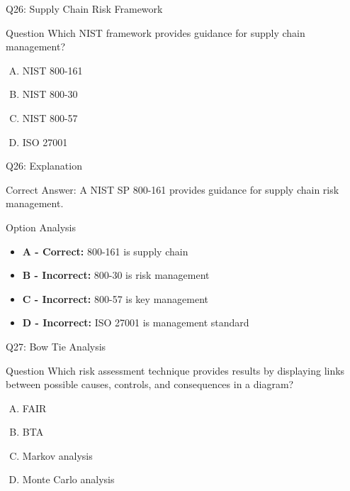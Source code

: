 \documentclass{beamer}
\begin{document}
	\begin{frame}{Q26: Supply Chain Risk Framework}
		\begin{block}{Question}
			Which NIST framework provides guidance for supply chain management?
		\end{block}
		\begin{enumerate}[(A)]
			\item NIST 800-161
			\item NIST 800-30
			\item NIST 800-57
			\item ISO 27001
		\end{enumerate}
	\end{frame}
	
	\begin{frame}{Q26: Explanation}
		\begin{block}{Correct Answer: A}
			NIST SP 800-161 provides guidance for supply chain risk management.
		\end{block}
		\begin{block}{Option Analysis}
			\begin{itemize}
				\item \textbf{A - Correct:} 800-161 is supply chain
				\item \textbf{B - Incorrect:} 800-30 is risk management
				\item \textbf{C - Incorrect:} 800-57 is key management
				\item \textbf{D - Incorrect:} ISO 27001 is management standard
			\end{itemize}
		\end{block}
	\end{frame}
	
	\begin{frame}{Q27: Bow Tie Analysis}
		\begin{block}{Question}
			Which risk assessment technique provides results by displaying links between possible causes, controls, and consequences in a diagram?
		\end{block}
		\begin{enumerate}[(A)]
			\item FAIR
			\item BTA
			\item Markov analysis
			\item Monte Carlo analysis
		\end{enumerate}
	\end{frame}
	
\end{document}
